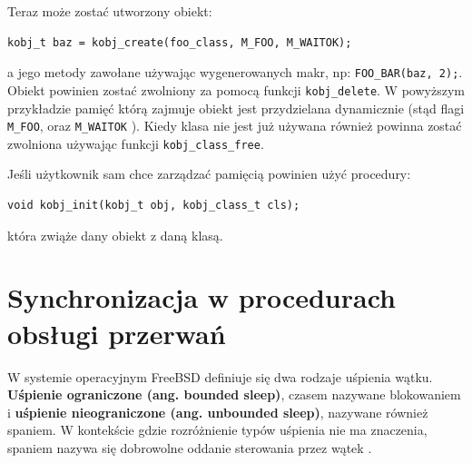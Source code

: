 \documentclass[shortabstract,inz]{iithesis}
\begin{document}
Teraz może zostać utworzony obiekt:

\begin{lstlisting}
kobj_t baz = kobj_create(foo_class, M_FOO, M_WAITOK);
\end{lstlisting}

a jego metody zawołane używając wygenerowanych makr, np: \texttt{FOO\_BAR(baz, 2);}.
Obiekt powinien zostać zwolniony za pomocą funkcji \texttt{kobj\_delete}.
W powyższym przykładzie pamięć którą zajmuje obiekt jest przydzielana dynamicznie
(stąd flagi \texttt{M\_FOO}, oraz \texttt{M\_WAITOK} \cite{man:malloc_9}).
Kiedy klasa nie jest już używana również powinna zostać zwolniona używając funkcji
\texttt{kobj\_class\_free}.

Jeśli użytkownik sam chce zarządzać pamięcią powinien użyć procedury:

\begin{lstlisting}
void kobj_init(kobj_t obj, kobj_class_t	cls);
\end{lstlisting}

która zwiąże dany obiekt z daną klasą.



\section{Synchronizacja w procedurach obsługi przerwań} %
\label{sec:synchro}


W systemie operacyjnym FreeBSD definiuje się dwa rodzaje uśpienia wątku.
\textbf{Uśpienie ograniczone (ang. bounded sleep)}, czasem nazywane blokowaniem 
i \textbf{uśpienie nieograniczone (ang. unbounded sleep)}, nazywane również spaniem.
W kontekście gdzie rozróżnienie typów uśpienia nie ma znaczenia, spaniem nazywa się
dobrowolne oddanie sterowania przez wątek \cite{man:locking_9}.
\end{document}
